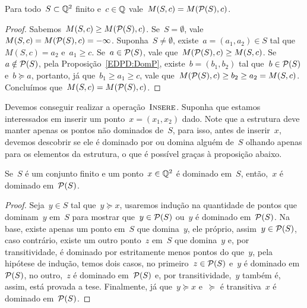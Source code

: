 \begin{prop} \label{EDPD:keepM}
Para todo~$S \subset \mathbb{Q}^2$ finito e~$c \in \mathbb{Q}$ vale~$M(S,c) = M(\mathcal{P}(S),c)$.
\end{prop}
\begin{proof}
Sabemos~$M(S,c) \geq M(\mathcal{P}(S),c)$. Se~$S = \emptyset$, vale~${M(S,c) = M(\mathcal{P}(S),c) = -\infty}$. Suponha~$S \neq \emptyset$, existe~$a=(a_1,a_2) \in S$ tal que~$M(S,c) = a_2$ e~$a_1 \geq c$. Se~$a \in \mathcal{P}(S)$, vale que~${ M(\mathcal{P}(S),c) \geq M(S,c) }$. Se~${ a \notin \mathcal{P}(S) }$, pela Proposição~\ref{EDPD:DomP}, existe~$b =(b_1,b_2)$ tal que~$b \in \mathcal{P}(S)$ e~$b \succeq a$, portanto, já que~$b_1 \geq a_1 \geq c$, vale que~$M(\mathcal{P}(S),c) \geq b_2 \geq a_2 = M(S,c)$. Concluímos que~${ M(S,c) = M(\mathcal{P}(S),c) }$.
\end{proof}

Devemos conseguir realizar a operação~$\textsc{Insere}$. Suponha que estamos interessados em inserir um ponto~$x = (x_1,x_2)$ dado. Note que a estrutura deve manter apenas os pontos não dominados de~$S$, para isso, antes de inserir~$x$, devemos descobrir se ele é dominado por ou domina alguém de~$S$ olhando apenas para os elementos da estrutura, o que é possível graças à proposição abaixo.

\begin{prop} \label{EDPD:DomP}
Se~$S$ é um conjunto finito e um ponto~$x \in \mathbb{Q}^2$ é dominado em~$S$, então,~$x$ é dominado em~$\mathcal{P}(S)$.
\end{prop}
\begin{proof}
Seja~$y \in S$ tal que~$y \succeq x$, usaremos indução na quantidade de pontos que dominam~$y$ em~$S$ para mostrar que~$y \in \mathcal{P}(S)$ ou~$y$ é dominado em~$\mathcal{P}(S)$. Na base, existe apenas um ponto em~$S$ que domina~$y$, ele próprio, assim~$y \in \mathcal{P}(S)$, caso contrário, existe um outro ponto~$z$ em~$S$ que domina~$y$ e, por transitividade, é dominado por estritamente menos pontos do que~$y$, pela hipótese de indução, temos dois casos, no primeiro~$z \in \mathcal{P}(S)$ e~$y$ é dominado em~$\mathcal{P}(S)$, no outro,~$z$ é dominado em~$\mathcal{P}(S)$ e, por transitividade,~$y$ também é, assim, está provada a tese. Finalmente, já que~$y \succeq x$ e~$\succeq$ é transitiva~$x$ é dominado em~$\mathcal{P}(S)$.
\end{proof}

